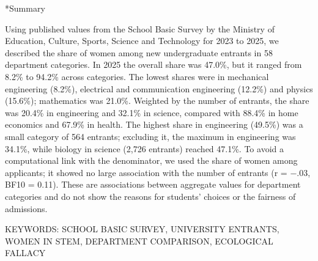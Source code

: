 \documentclass[a4paper,10pt,twocolumn]{ltjsarticle}
\makeatletter
\renewcommand{\section}{\@startsection{section}{1}{\z@}{1.1\Cvs \@plus.4\Cdp \@minus.2\Cdp}{.5\Cvs \@plus.2\Cdp}{\normalfont\gtfamily\bfseries\large}}
\makeatother
\begin{document}
\section*{Summary}
{\footnotesize\setlength{\parindent}{0pt}Using published values from the School Basic Survey by the Ministry of Education, Culture, Sports, Science and Technology for 2023 to 2025, we described the share of women among new undergraduate entrants in 58 department categories. In 2025 the overall share was 47.0\%, but it ranged from 8.2\% to 94.2\% across categories. The lowest shares were in mechanical engineering (8.2\%), electrical and communication engineering (12.2\%) and physics (15.6\%); mathematics was 21.0\%. Weighted by the number of entrants, the share was 20.4\% in engineering and 32.1\% in science, compared with 88.4\% in home economics and 67.9\% in health. The highest share in engineering (49.5\%) was a small category of 564 entrants; excluding it, the maximum in engineering was 34.1\%, while biology in science (2,726 entrants) reached 47.1\%. To avoid a computational link with the denominator, we used the share of women among applicants; it showed no large association with the number of entrants (r = −.03, BF10 = 0.11). These are associations between aggregate values for department categories and do not show the reasons for students' choices or the fairness of admissions.\par\smallskip KEYWORDS: SCHOOL BASIC SURVEY, UNIVERSITY ENTRANTS, WOMEN IN STEM, DEPARTMENT COMPARISON, ECOLOGICAL FALLACY\par}
\medskip\noindent{}
\end{document}
